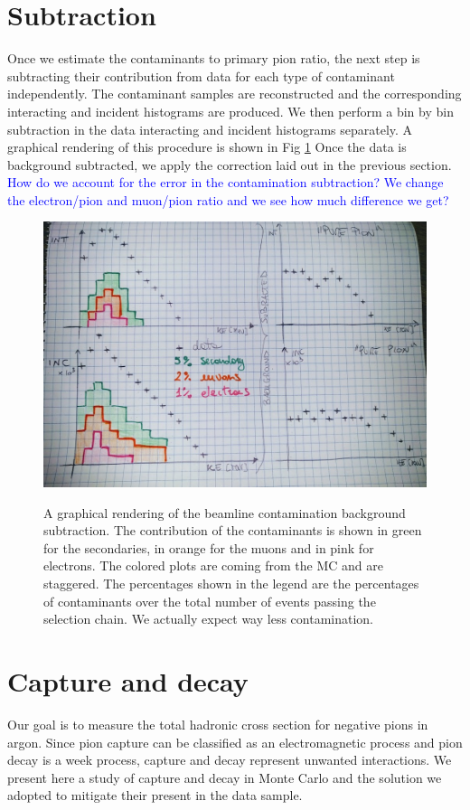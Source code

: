 \section{Subtraction}
Once we estimate the contaminants to primary pion ratio, the next step is subtracting their contribution from data for each type of contaminant independently. The contaminant samples are reconstructed and the corresponding interacting and incident histograms are produced. We then perform a bin by bin subtraction in the data interacting and incident histograms separately. A graphical rendering of this procedure is shown in Fig \ref{fig:backgroundSubtraction}
Once the data is background subtracted, we apply the correction laid out in the previous section.
\textcolor{blue}{How do we account for the error in the contamination subtraction? We change the electron/pion and muon/pion ratio and we see how much difference we get?}

\begin{figure}
\includegraphics[width=\textwidth,height=\textheight,keepaspectratio]{Chapter-9/Images/FakePlot.jpg}
\label{fig:backgroundSubtraction}
\caption{A graphical rendering of the beamline contamination background subtraction. The contribution of the contaminants is shown in green for the secondaries, in orange for the muons and in pink for electrons. The colored plots are coming from the MC and are staggered. The percentages shown in the legend are the percentages of contaminants over the total number of events  passing the selection chain. We actually expect way less contamination.}
\end{figure}

\section{Capture and decay}\label{ch:CaptureAndDecay}
Our goal is to measure the total hadronic cross section for negative pions in argon. Since pion capture can be classified as an electromagnetic process and pion decay is a week process,  capture and decay represent unwanted interactions. We present here a study of capture and decay in Monte Carlo and the solution we adopted to mitigate their present in the data sample. 

